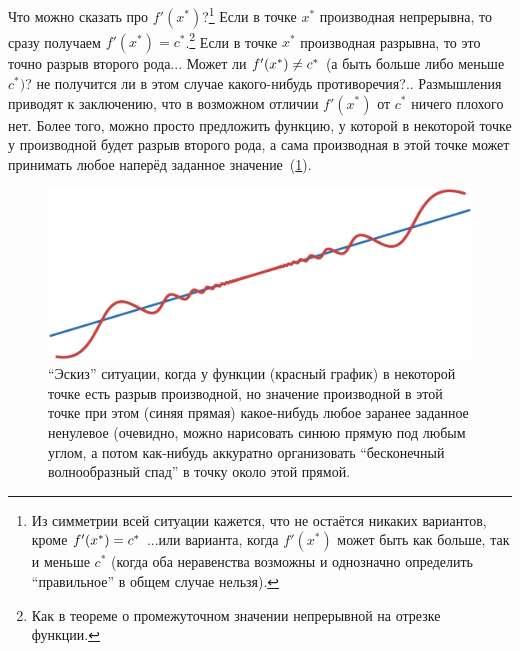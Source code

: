 \documentclass[a4paper,12pt]{article}
\begin{document}
  Что можно сказать про $f'(x^*)$?\footnote{
    Из симметрии всей ситуации кажется, что не остаётся никаких вариантов, кроме $f'(x^*) \hm= c^*$ ...или варианта, когда $f'(x^*)$ может быть как больше, так и меньше $c^*$ (когда оба неравенства возможны и однозначно определить ``правильное'' в общем случае нельзя).
  }
  Если в точке $x^*$ производная непрерывна, то сразу получаем $f'(x^*) = c^*$.\footnote{
    Как в теореме о промежуточном значении непрерывной на отрезке функции.
  }
  Если в точке $x^*$ производная разрывна, то это точно разрыв второго рода...
  Может ли $f'(x^*) \hm{\not=} c^*$ (а быть больше либо меньше $c^*)$? не получится ли в этом случае какого-нибудь противоречия?..
  Размышления приводят к заключению, что в возможном отличии $f'(x^*)$ от $c^*$ ничего плохого нет.
  Более того, можно просто предложить функцию, у которой в некоторой точке у производной будет разрыв второго рода, а сама производная в этой точке может принимать любое наперёд заданное значение~(\ref{fig:any-diff-at-break}).
  

  \begin{figure}[ht]
      \centering
      
      \includegraphics[width=0.8\linewidth]{images/func-with-any-diff-at-break3}
      
      \caption{``Эскиз'' ситуации, когда у функции (красный график) в некоторой точке есть разрыв производной, но значение производной в этой точке при этом (синяя прямая) какое-нибудь любое заранее заданное ненулевое (очевидно, можно нарисовать синюю прямую под любым углом, а потом как-нибудь аккуратно организовать ``бесконечный волнообразный спад'' в точку около этой прямой.}
      \label{fig:any-diff-at-break}
  \end{figure}
\end{document}
